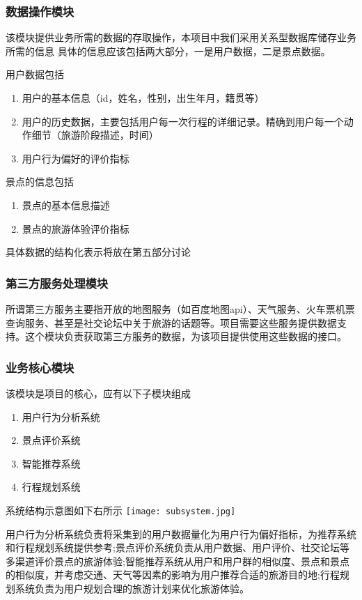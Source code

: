 \documentclass[titlepage]{article}
\begin{document}
\subsubsection{数据操作模块}
该模块提供业务所需的数据的存取操作，本项目中我们采用关系型数据库储存业务所需的信息
具体的信息应该包括两大部分，一是用户数据，二是景点数据。

用户数据包括
\begin{enumerate}
\item 用户的基本信息（id，姓名，性别，出生年月，籍贯等）
\item 用户的历史数据，主要包括用户每一次行程的详细记录。精确到用户每一个动作细节（旅游阶段描述，时间）
\item 用户行为偏好的评价指标
\end{enumerate}

景点的信息包括
\begin{enumerate}
\item 景点的基本信息描述
\item 景点的旅游体验评价指标
\end{enumerate}

具体数据的结构化表示将放在第五部分讨论
\subsubsection{第三方服务处理模块}
所谓第三方服务主要指开放的地图服务（如百度地图api）、天气服务、火车票机票查询服务、甚至是社交论坛中关于旅游的话题等。项目需要这些服务提供数据支持。这个模块负责获取第三方服务的数据，为该项目提供使用这些数据的接口。
\subsubsection{业务核心模块}
该模块是项目的核心，应有以下子模块组成
\begin{enumerate}
\item 用户行为分析系统
\item 景点评价系统
\item 智能推荐系统
\item 行程规划系统
\end{enumerate}

系统结构示意图如下右所示
\texttt{[image: subsystem.jpg]}

用户行为分析系统负责将采集到的用户数据量化为用户行为偏好指标，为推荐系统和行程规划系统提供参考;景点评价系统负责从用户数据、用户评价、社交论坛等多渠道评价景点的旅游体验;智能推荐系统从用户和用户群的相似度、景点和景点的相似度，并考虑交通、天气等因素的影响为用户推荐合适的旅游目的地;行程规划系统负责为用户规划合理的旅游计划来优化旅游体验。
\end{document}
